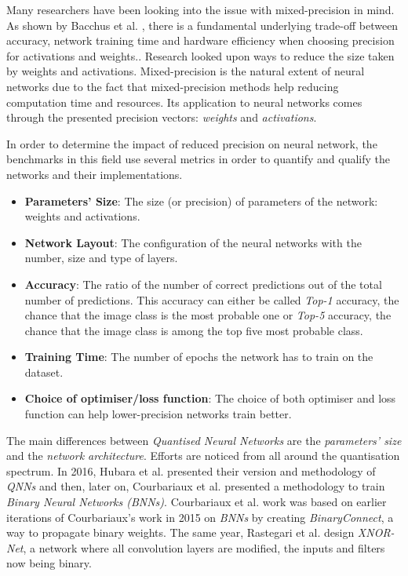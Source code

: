 Many researchers have been looking into the issue with mixed-precision in mind. As shown by Bacchus et al. \cite{Bacchus2020}, there is a fundamental underlying trade-off between accuracy, network training time and hardware efficiency when choosing precision for activations and weights.. Research looked upon ways to reduce the size taken by weights and activations. Mixed-precision is the natural extent of neural networks due to the fact that mixed-precision methods help reducing computation time and resources. Its application to neural networks comes through the presented precision vectors: \emph{weights} and \emph{activations}.

In order to determine the impact of reduced precision on neural network, the benchmarks in this field use several metrics in order to quantify and qualify the networks and their implementations.
\begin{itemize}
	\item \textbf{Parameters' Size}: The size (or precision) of parameters of the network: weights and activations.
	\item \textbf{Network Layout}: The configuration of the neural networks with the number, size and type of layers.
	\item \textbf{Accuracy}: The ratio of the number of correct predictions out of the total number of predictions. This accuracy can either be called \emph{Top-1} accuracy, the chance that the image class is the most probable one or \emph{Top-5} accuracy, the chance that the image class is among the top five most probable class.
	\item \textbf{Training Time}: The number of epochs the network has to train on the dataset.
  \item \textbf{Choice of optimiser/loss function}: The choice of both optimiser and loss function can help lower-precision networks train better.
\end{itemize}

The main differences between \emph{Quantised Neural Networks} are the \emph{parameters' size} and the \emph{network architecture}. Efforts are noticed from all around the quantisation spectrum. In 2016, Hubara et al. \cite{Hubara2016} presented their version and methodology of \emph{QNNs} and then, later on, Courbariaux et al. \cite{Courbariaux2016} presented a methodology to train \emph{Binary Neural Networks (BNNs)}. Courbariaux et al. work was based on earlier iterations of Courbariaux's work in 2015 \cite{Courbariaux2015} on \emph{BNNs} by creating \emph{BinaryConnect}, a way to propagate binary weights. The same year, Rastegari et al. \cite{Rastegari2016} design \emph{XNOR-Net}, a network where all convolution layers are modified, the inputs and filters now being binary.

